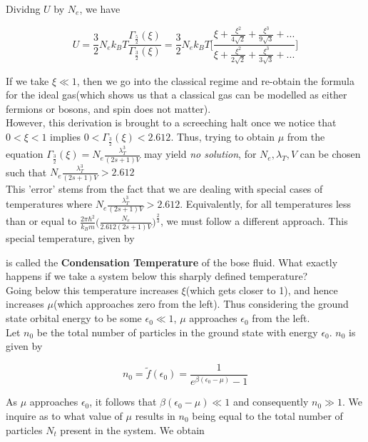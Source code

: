 \documentclass[oneside]{book}
\begin{document}
Dividng $U$ by $N_e$, we have

\[U = \frac{3}{2}N_ek_BT\frac{\Gamma_{\frac{5}{2}}(\xi)}{\Gamma_{\frac{3}{2}}(\xi) }
= \frac{3}{2}N_ek_BT\Bigg[\frac{\xi + \frac{\xi^2}{4\sqrt 2} + \frac{\xi^3}{9 \sqrt 3} + ...}{\xi + \frac{\xi^2}{2\sqrt 2} + \frac{\xi^3}{3 \sqrt 3} + ...} \Bigg]
 \]
 
 If we take $\xi \ll 1$, then we go into the classical regime and re-obtain the formula for the ideal gas(which shows us that a classical gas can be modelled as either fermions or bosons, and spin does not matter).\\
 
 However, this derivation is brought to a screeching halt once we notice that $0<\xi<1$ implies $0<\Gamma_{\frac{3}{2}}(\xi)<2.612$. Thus, trying to obtain $\mu$ from the equation $\Gamma_{\frac{3}{2}}(\xi) = N_e \frac{\lambda_T^3}{(2s+1)V} $ may yield \emph{no solution}, for 
 $N_e, \lambda_T, V$ can be chosen such that $N_e \frac{\lambda_T^3}{(2s+1)V} > 2.612$\\
 
This 'error' stems from the fact that we are dealing with special cases of temperatures where $N_e \frac{\lambda_T^3}{(2s+1)V} > 2.612$. Equivalently, for all temperatures less than or equal to $\frac{2\pi\hbar^2}{k_Bm}\Big(\frac{N_e}{2.612(2s+1)V}\Big)^\frac{2}{3}$, we must follow a different approach. This special temperature, given by
 
 \begin{center}
  \end{center}
  
 is called the \textbf{Condensation Temperature} of the bose fluid. What exactly happens if we take a system below this sharply defined temperature?\\
 
 Going below this temperature increases $\xi$(which gets closer to 1), and hence increases $\mu$(which approaches zero from the left). Thus considering the ground state orbital energy to be some $\epsilon_0 \ll 1$, $\mu$ approaches $\epsilon_0$ from the left. \\
 
Let $n_0$ be the total number of particles in the ground state with energy $\epsilon_0$. $n_0$ is given by

\[n_0 = \tilde f(\epsilon_0) =  \frac{1}{e^{\beta(\epsilon_0 - \mu)}-1}\]

As $\mu$ approaches $\epsilon_0$, it follows that $\beta(\epsilon_0 - \mu) \ll 1$ and consequently $n_0 \gg 1$. We inquire as to what value of $\mu$ results in $n_0$ being equal to the total number of particles $N_t$ present in the system. We obtain
\end{document}
